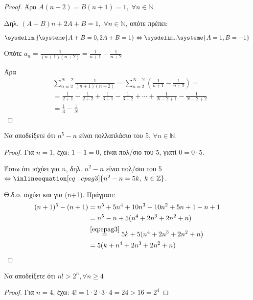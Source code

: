 \begin{multicols}{2}
\begin{enumerate}
\begin{proof}
        Άρα $A(n+2) = B(n+1) = 1, \; \forall n \in \mathbb{N}$

        Δηλ. $ (A+B)n+2A+B=1, \; \forall n \in \mathbb{N} $, οπότε πρέπει:

      $  \sysdelim.\}\systeme{A+B=0,2A+B=1} \Leftrightarrow \sysdelim..
      \systeme{A=1,B=-1} $

      Οπότε $ a_{n} = \frac{1}{(n+1)(n+2)} = \frac{1}{n+1} - \frac{1}{n+2} $

      Άρα 
      \begin{align*}
        &\sum_{n=2}^{N-2} \frac{1}{(n+1)(n+2)} 
        = \sum_{n=2}^{N-2} \left(\frac{1}{n+1} - \frac{1}{n+2}\right) = \\
        &= \frac{1}{2+1} - \frac{1}{2+2} + \frac{1}{3+1} - \frac{1}{3+2} +\cdots +
        \frac{1}{N-2+1} - \frac{1}{N-2+2} \\
        &= \frac{1}{3} - \frac{1}{N} 
      \end{align*}
    \end{proof}

  \item \textcolor{Col1}{Να αποδείξετε ότι $ n^{5} - n $ είναι 
    πολλαπλάσιο του 5, $ \forall n \in \mathbb{N} $.}
    \begin{proof}
      Για $ n=1 $, έχω: $ 1-1=0 $, είναι πολ/σιο του 5, γιατί $0=0\cdot 5$.

      Έστω ότι ισχύει για $n$, δηλ. $n^{2}-n $ 
      είναι πολ/σιο του 5 $
      \Leftrightarrow \inlineequation[eq:epag3]{n^{2}-n=5k, 
      \; k \in \mathbb{Z}} $.

      Θ.δ.ο. ισχύει και για (n+1). Πράγματι:
      \begin{align*}
        (n+1)^{5}-(n+1) &= n^{5}+5n^{4}+10n^{3}+10n^{2}+5n+1-n+1 \\
                        &=n^{5}-n+5(n^{4}+2n^{3}+2n^{2}+n) \\
                        &\overset{\eqref{eq:epag3}}{=} 5k 
                        + 5(n^{4}+2n^{3}+2n^{2}+n) \\ 
                        &= 5(k + n^{4}+2n^{3}+2n^{2}+n)
      \end{align*}
    \end{proof}

  \item \textcolor{Col1}{Να αποδείξετε ότι $ n! > 2^{n}, \forall n \geq 4 $}
    \begin{proof}
    \item {}
      Για $ n=4 $, έχω: $ 4! = 1\cdot 2 \cdot 3 \cdot 4 = 24 > 16 = 2^{4} $


\end{proof}
\end{enumerate}
\end{multicols}

